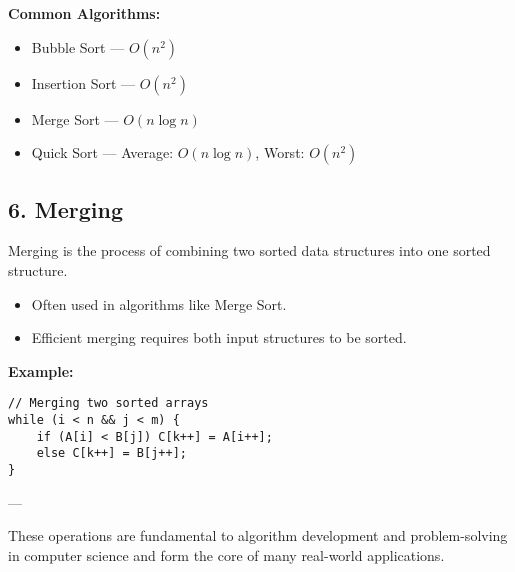 \textbf{Common Algorithms:}
\begin{itemize}
  \item Bubble Sort — $O(n^2)$
  \item Insertion Sort — $O(n^2)$
  \item Merge Sort — $O(n \log n)$
  \item Quick Sort — Average: $O(n \log n)$, Worst: $O(n^2)$
\end{itemize}

\subsection*{\large \textbf{6. Merging}}

Merging is the process of combining two sorted data structures into one sorted structure.

\begin{itemize}
  \item Often used in algorithms like Merge Sort.
  \item Efficient merging requires both input structures to be sorted.
\end{itemize}

\textbf{Example:}
\begin{lstlisting}
// Merging two sorted arrays
while (i < n && j < m) {
    if (A[i] < B[j]) C[k++] = A[i++];
    else C[k++] = B[j++];
}
\end{lstlisting}

---

These operations are fundamental to algorithm development and problem-solving in computer science and form the core of many real-world applications.
